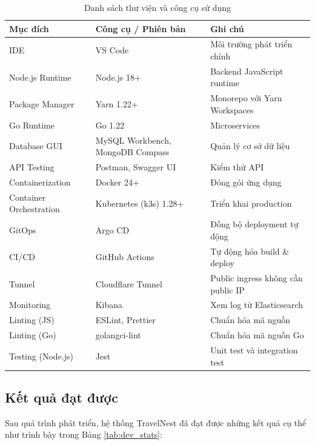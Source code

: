 \documentclass[13pt,a4paper,twoside]{report}
\begin{document}
\begin{table}[H]
  \centering
  \caption{Danh sách thư viện và công cụ sử dụng}
  \label{tab:tools}
  \begin{tabularx}{\textwidth}{p{4cm} p{3cm} X}
    \toprule
    \textbf{Mục đích} & \textbf{Công cụ / Phiên bản} & \textbf{Ghi chú} \\
    \midrule
    IDE & VS Code & Môi trường phát triển chính \\
    Node.js Runtime & Node.js 18+ & Backend JavaScript runtime \\
    Package Manager & Yarn 1.22+ & Monorepo với Yarn Workspaces \\
    Go Runtime & Go 1.22 & Microservices \\
    Database GUI & MySQL Workbench, MongoDB Compass & Quản lý cơ sở dữ liệu \\
    API Testing & Postman, Swagger UI & Kiểm thử API \\
    Containerization & Docker 24+ & Đóng gói ứng dụng \\
    Container Orchestration & Kubernetes (k3s) 1.28+ & Triển khai production \\
    GitOps & Argo CD & Đồng bộ deployment tự động \\
    CI/CD & GitHub Actions & Tự động hóa build \& deploy \\
    Tunnel & Cloudflare Tunnel & Public ingress không cần public IP \\
    Monitoring & Kibana & Xem log từ Elasticsearch \\
    Linting (JS) & ESLint, Prettier & Chuẩn hóa mã nguồn \\
    Linting (Go) & golangci-lint & Chuẩn hóa mã nguồn Go \\
    Testing (Node.js) & Jest & Unit test và integration test \\
    \bottomrule
  \end{tabularx}
\end{table}

\subsection{Kết quả đạt được}

Sau quá trình phát triển, hệ thống TravelNest đã đạt được những kết quả cụ thể như trình bày trong Bảng \ref{tab:dev_stats}:
\end{document}
